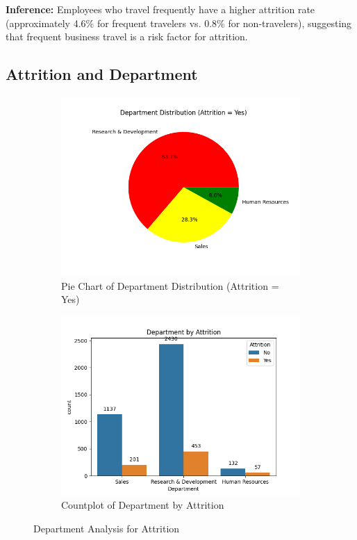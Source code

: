 \documentclass[12pt, a4paper]{article}
\begin{document}
\textbf{Inference:} Employees who travel frequently have a higher attrition rate (approximately 4.6\% for frequent travelers vs. 0.8\% for non-travelers), suggesting that frequent business travel is a risk factor for attrition.

\subsection{Attrition and Department}
\begin{figure}[H]
    \centering
    \begin{subfigure}[b]{0.45\textwidth}
        \includegraphics[width=\textwidth]{plots/attrition_department_pie.png}
        \caption{Pie Chart of Department Distribution (Attrition = Yes)}
        \label{fig:attrition_department_pie}
    \end{subfigure}
    \hfill
    \begin{subfigure}[b]{0.45\textwidth}
        \includegraphics[width=\textwidth]{plots/attrition_department_countplot.png}
        \caption{Countplot of Department by Attrition}
        \label{fig:attrition_department_count}
    \end{subfigure}
    \caption{Department Analysis for Attrition}
\end{figure}
\end{document}
